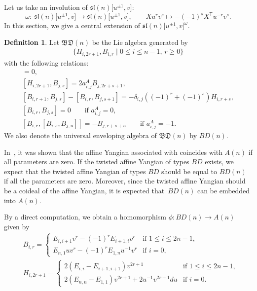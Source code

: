 \documentclass[10pt,a4paper]{amsart}
\numberwithin{equation}{section}
\theoremstyle{definition}
\newtheorem{Definition}[Theorem]{Definition}
\begin{document}
Let us take an involution of $\mathfrak{sl}(n)\bigl[u^{\pm1},v\bigr]$:
\begin{equation*}
\omega\colon\ \mathfrak{sl}(n)\bigl[u^{\pm1},v\bigr]\to\mathfrak{sl}(n)\bigl[u^{\pm1},v\bigr],\qquad Xu^rv^s\mapsto -(-1)^{s}X^{\mathsf{T}}u^{-r}v^{s}.
\end{equation*}
In this section, we give a central extension of $\mathfrak{sl}(n)\bigl[u^{\pm1},v\bigr]^\omega$.
\begin{Definition}
Let $\mathfrak{BD}(n)$ be the Lie algebra generated by
\begin{gather*}
\{H_{i,2r+1},B_{i,r}\mid0\leq i\leq n-1,\, r\geq0\}
\end{gather*}
with the following relations:
\begin{gather*}
[H_{i,2r+1},H_{j,2s+1}]=0,\\
[H_{i,2r+1},B_{j,s}]=2a^A_{i,j}B_{j,2r+s+1},\\
[B_{i,r+1},B_{j,s}]-[B_{i,r},B_{j,s+1}]=-\delta_{i,j}((-1)^r+(-1)^s)H_{i,r+s},\\
[B_{i,r},B_{j,s}]=0\qquad \text{if }a^A_{i,j}=0,\\
[B_{i,r},[B_{i,s},B_{j,u}]]=-B_{j,r+s+u}\qquad \text{if }a^A_{i,j}=-1.
\end{gather*}
We also denote the universal enveloping algebra of $\mathfrak{BD}(n)$ by $BD(n)$.
\end{Definition}
In~\cite{Gu1}, it was shown that the affine Yangian associated with  coincides with $A(n)$ if all parameters are zero. If the twisted affine Yangian of types $BD$ exists, we expect that the twisted affine Yangian of types $BD$ should be equal to $BD(n)$ if all the parameters are zero. Moreover, since the twisted affine Yangian should be a coideal of the affine Yangian, it is expected that~$BD(n)$ can be embedded into $A(n)$.

By a direct computation, we obtain a homomorphism $\phi\colon BD(n)\to A(n)$ given by
\begin{align*}
&B_{i,r}=\begin{cases}
E_{i,i+1}v^r-(-1)^rE_{i+1,i}v^r&\text{if }1\leq i\leq 2n-1,\\
E_{n,1}uv^r-(-1)^rE_{1,n}u^{-1}v^r&\text{if }i=0,
\end{cases}\\
&H_{i,2r+1}=\begin{cases}
2(E_{i,i}-E_{i+1,i+1})v^{2r+1}&\text{if }1\leq i\leq 2n-1,\\
2(E_{n,n}-E_{1,1})v^{2r+1}+2u^{-1}v^{2r+1}du&\text{if }i=0.
\end{cases}
\end{align*}
\end{document}
